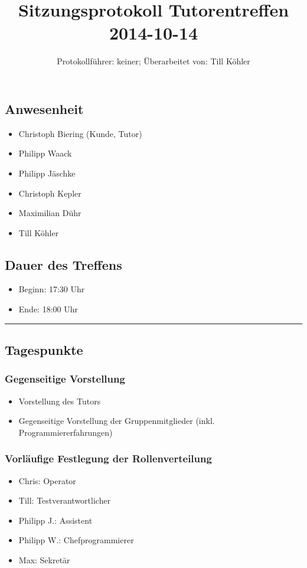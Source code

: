 \documentclass[12pt,a4paper]{article}
\author{Protokollführer: keiner; Überarbeitet von: Till Köhler}
\title{Sitzungsprotokoll Tutorentreffen 2014-10-14}
\date{}
\begin{document}
\maketitle

\subsection*{Anwesenheit}
\medskip
\begin{itemize}
\item Christoph Biering (Kunde, Tutor)
\item Philipp Waack
\item Philipp Jäschke
\item Christoph Kepler
\item Maximilian Dühr
\item Till Köhler
\end{itemize}

\subsection*{Dauer des Treffens}
\medskip
\begin{itemize}
\item Beginn: 17:30 Uhr
\item Ende: 18:00 Uhr
\end{itemize}

\noindent\rule{\textwidth}{1pt}

\subsection*{Tagespunkte}
\medskip

\subsubsection*{Gegenseitige Vorstellung}
\begin{itemize}
\item Vorstellung des Tutors
\item Gegenseitige Vorstellung der Gruppenmitglieder (inkl. Programmiererfahrungen)
\end{itemize}

\subsubsection*{Vorläufige Festlegung der Rollenverteilung}
\begin{itemize}
\item Chris: Operator
\item Till: Testverantwortlicher
\item Philipp J.: Assistent
\item Philipp W.: Chefprogrammierer
\item Max: Sekretär
\end{itemize}
\end{document}
